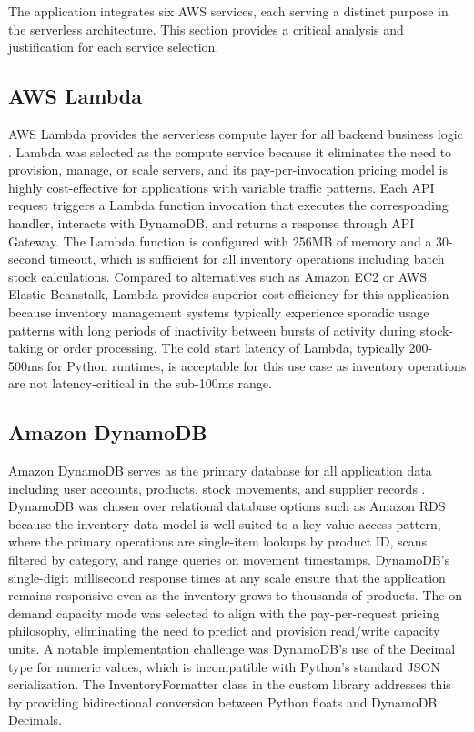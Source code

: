 \documentclass[conference]{IEEEtran}
\begin{document}
The application integrates six AWS services, each serving a distinct purpose in the serverless architecture. This section provides a critical analysis and justification for each service selection.

\subsection{AWS Lambda}

AWS Lambda provides the serverless compute layer for all backend business logic \cite{awslambda}. Lambda was selected as the compute service because it eliminates the need to provision, manage, or scale servers, and its pay-per-invocation pricing model is highly cost-effective for applications with variable traffic patterns. Each API request triggers a Lambda function invocation that executes the corresponding handler, interacts with DynamoDB, and returns a response through API Gateway. The Lambda function is configured with 256MB of memory and a 30-second timeout, which is sufficient for all inventory operations including batch stock calculations. Compared to alternatives such as Amazon EC2 or AWS Elastic Beanstalk, Lambda provides superior cost efficiency for this application because inventory management systems typically experience sporadic usage patterns with long periods of inactivity between bursts of activity during stock-taking or order processing. The cold start latency of Lambda, typically 200-500ms for Python runtimes, is acceptable for this use case as inventory operations are not latency-critical in the sub-100ms range.

\subsection{Amazon DynamoDB}

Amazon DynamoDB serves as the primary database for all application data including user accounts, products, stock movements, and supplier records \cite{awsdynamodb}. DynamoDB was chosen over relational database options such as Amazon RDS because the inventory data model is well-suited to a key-value access pattern, where the primary operations are single-item lookups by product ID, scans filtered by category, and range queries on movement timestamps. DynamoDB's single-digit millisecond response times at any scale ensure that the application remains responsive even as the inventory grows to thousands of products. The on-demand capacity mode was selected to align with the pay-per-request pricing philosophy, eliminating the need to predict and provision read/write capacity units. A notable implementation challenge was DynamoDB's use of the Decimal type for numeric values, which is incompatible with Python's standard JSON serialization. The InventoryFormatter class in the custom library addresses this by providing bidirectional conversion between Python floats and DynamoDB Decimals.
\end{document}
